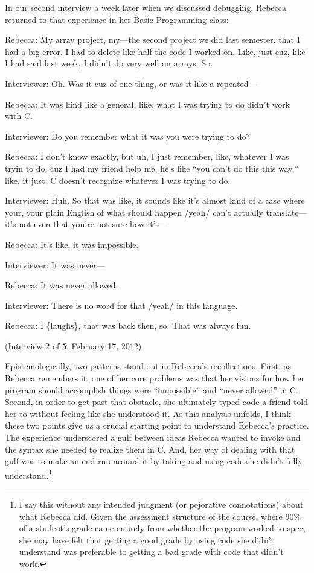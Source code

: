 In our second interview a week later when we discussed debugging,
Rebecca returned to that experience in her Basic Programming class:

Rebecca: My array project, my---the second project we did last semester,
that I had a big error. I had to delete like half the code I worked on.
Like, just cuz, like I had said last week, I didn't do very well on
arrays. So.

Interviewer: Oh. Was it cuz of one thing, or was it like a repeated---

Rebecca: It was kind like a general, like, what I was trying to do
didn't work with C.

Interviewer: Do you remember what it was you were trying to do?

Rebecca: I don't know exactly, but uh, I just remember, like, whatever I
was tryin to do, cuz I had my friend help me, he's like ``you can't do
this this way,'' like, it just, C doesn't recognize whatever I was
trying to do.

Interviewer: Huh. So that was like, it sounds like it's almost kind of a
case where your, your plain English of what should happen /yeah/ can't
actually translate---it's not even that you're not sure how it's---

Rebecca: It's like, it was impossible.

Interviewer: It was never---

Rebecca: It was never allowed.

Interviewer: There is no word for that /yeah/ in this language.

Rebecca: I \{laughs\}, that was back then, so. That was always fun.

(Interview 2 of 5, February 17, 2012)

Epistemologically, two patterns stand out in Rebecca's recollections.
First, as Rebecca remembers it, one of her core problems was that her
visions for how her program should accomplish things were ``impossible''
and ``never allowed'' in C. Second, in order to get past that obstacle,
she ultimately typed code a friend told her to without feeling like she
understood it. As this analysis unfolds, I think these two points give
us a crucial starting point to understand Rebecca's practice. The
experience underscored a gulf between ideas Rebecca wanted to invoke and
the syntax she needed to realize them in C. And, her way of dealing with
that gulf was to make an end-run around it by taking and using code she
didn't fully understand.\footnote{I say this without any intended
  judgment (or pejorative connotations) about what Rebecca did. Given
  the assessment structure of the course, where 90\% of a student's
  grade came entirely from whether the program worked to spec, she may
  have felt that getting a good grade by using code she didn't
  understand was preferable to getting a bad grade with code that didn't
  work.}

